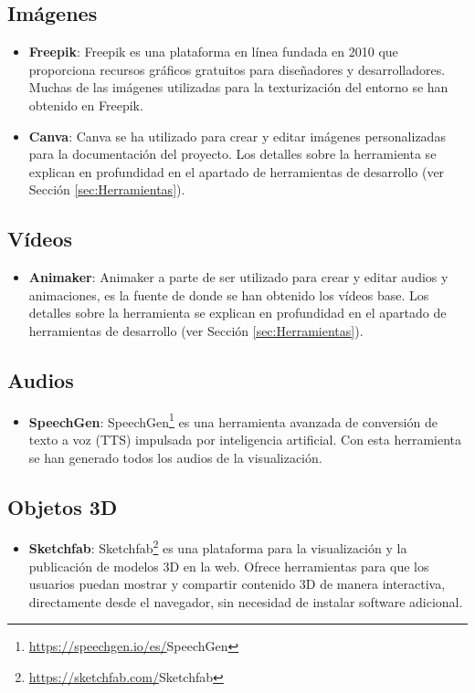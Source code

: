 \documentclass[a4paper, 12pt]{book}
\begin{document}
    \subsection{Imágenes} 
    \begin{itemize}
        \item \textbf{Freepik}: Freepik es una plataforma en línea fundada en 2010 que proporciona recursos gráficos gratuitos para diseñadores y desarrolladores.
        Muchas de las imágenes utilizadas para la texturización del entorno se han obtenido en Freepik.
        \item \textbf{Canva}: Canva se ha utilizado para crear y editar imágenes personalizadas para la documentación del proyecto. Los detalles sobre la herramienta se explican en profundidad en el apartado de herramientas de desarrollo (ver Sección \ref{sec:Herramientas}).
    \end{itemize}
    
    \subsection{Vídeos}
    \begin{itemize}
        \item \textbf{Animaker}: Animaker a parte de ser utilizado para crear y editar audios y animaciones, es la fuente de donde se han obtenido los vídeos base. Los detalles sobre la herramienta se explican en profundidad en el apartado de herramientas de desarrollo (ver Sección \ref{sec:Herramientas}).
    \end{itemize}
    
    \subsection{Audios} 
    \begin{itemize}
        \item \textbf{SpeechGen}: SpeechGen\footnote{\url{https://speechgen.io/es/}{SpeechGen}} es una herramienta avanzada de conversión de texto a voz (TTS) impulsada por inteligencia artificial. Con esta herramienta se han generado todos los audios de la visualización.
    \end{itemize}
    \subsection{Objetos 3D} 
    \begin{itemize}
        \item \textbf{Sketchfab}: Sketchfab\footnote{\url{https://sketchfab.com/}{Sketchfab}} es una plataforma para la visualización y la publicación de modelos 3D en la web. Ofrece herramientas para que los usuarios puedan mostrar y compartir contenido 3D de manera interactiva, directamente desde el navegador, sin necesidad de instalar software adicional.
    \end{itemize}
    
\end{document}
